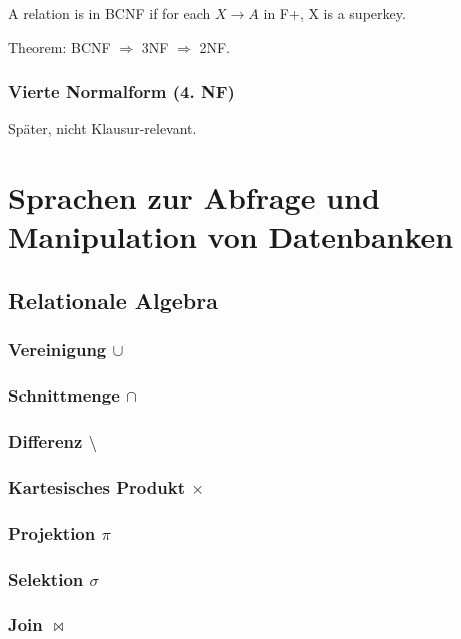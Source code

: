A relation is in BCNF if for each $X \rightarrow A$ in F+, X is a superkey.

Theorem:
BCNF $\Rightarrow$ 3NF $\Rightarrow$ 2NF.

\subsubsection{Vierte Normalform (4. NF)}

Später, nicht Klausur-relevant.

%
%
%
\section{Sprachen zur Abfrage und Manipulation von Datenbanken}

%
%
\subsection{Relationale Algebra}

\subsubsection{Vereinigung $\cup$}

\subsubsection{Schnittmenge $\cap$}

\subsubsection{Differenz $\setminus$}

\subsubsection{Kartesisches Produkt $\times$}

\subsubsection{Projektion $\pi$}

\subsubsection{Selektion $\sigma$}

\subsubsection{Join $\bowtie$}

